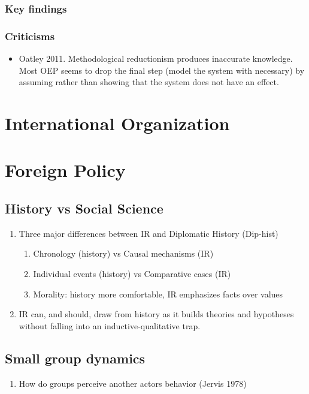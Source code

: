 \documentclass[11pt]{article}
\begin{document}
\subsubsection{Key findings}
\label{sec-2-1-2}
\subsubsection{Criticisms}
\label{sec-2-1-3}
\begin{itemize}
\item Oatley 2011.
\label{sec-2-1-3-1}
Methodological reductionism produces inaccurate knowledge. Most OEP
seems to drop the final step (model the system with necessary) by
assuming rather than showing that the system does not have an effect.
\end{itemize}
\section{International Organization}
\label{sec-3}

\section{Foreign Policy}
\label{sec-4}
\subsection{History vs Social Science}
\label{sec-4-1}
\begin{enumerate}
\item Three major differences between IR and Diplomatic History (Dip-hist)
\begin{enumerate}
\item Chronology (history) vs Causal mechanisms (IR)
\item Individual events (history) vs Comparative cases (IR)
\item Morality: history more comfortable, IR emphasizes facts over values
\end{enumerate}
\item IR can, and should, draw from history as it builds theories and
hypotheses without falling into an inductive-qualitative trap.
\end{enumerate}
\subsection{Small group dynamics}
\label{sec-4-2}
\begin{enumerate}
\item How do groups perceive another actors behavior (Jervis 1978)
\end{enumerate}
\end{document}
